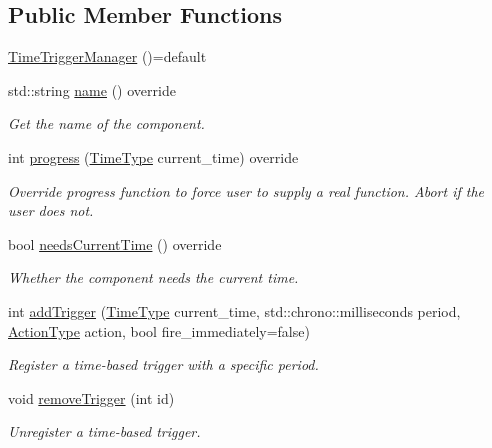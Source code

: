 \subsection*{Public Member Functions}
\begin{DoxyCompactItemize}
\item 
\hyperlink{structvt_1_1timetrigger_1_1_time_trigger_manager_a5739a97e0a8c7a19943d030a04e63a35}{Time\+Trigger\+Manager} ()=default
\item 
std\+::string \hyperlink{structvt_1_1timetrigger_1_1_time_trigger_manager_a8eba6c4f2596f9f8a6ad374ac020c8f4}{name} () override
\begin{DoxyCompactList}\small\item\em Get the name of the component. \end{DoxyCompactList}\item 
int \hyperlink{structvt_1_1timetrigger_1_1_time_trigger_manager_a15cc796e1f07dbf32c04b3fb3f3ce06c}{progress} (\hyperlink{namespacevt_a876a9d0cd5a952859c72de8a46881442}{Time\+Type} current\+\_\+time) override
\begin{DoxyCompactList}\small\item\em Override progress function to force user to supply a real function. Abort if the user does not. \end{DoxyCompactList}\item 
bool \hyperlink{structvt_1_1timetrigger_1_1_time_trigger_manager_a2e65cfcbbbb1224b08263996b0fb1eff}{needs\+Current\+Time} () override
\begin{DoxyCompactList}\small\item\em Whether the component needs the current time. \end{DoxyCompactList}\item 
int \hyperlink{structvt_1_1timetrigger_1_1_time_trigger_manager_a42729a0a83f734dad3ef6d95b5afb3d9}{add\+Trigger} (\hyperlink{namespacevt_a876a9d0cd5a952859c72de8a46881442}{Time\+Type} current\+\_\+time, std\+::chrono\+::milliseconds period, \hyperlink{namespacevt_ae0a5a7b18cc99d7b732cb4d44f46b0f3}{Action\+Type} action, bool fire\+\_\+immediately=false)
\begin{DoxyCompactList}\small\item\em Register a time-\/based trigger with a specific period. \end{DoxyCompactList}\item 
void \hyperlink{structvt_1_1timetrigger_1_1_time_trigger_manager_ae6bdddd787aa88b714686270587e1ff5}{remove\+Trigger} (int id)
\begin{DoxyCompactList}\small\item\em Unregister a time-\/based trigger. \end{DoxyCompactList}\item 

\end{DoxyCompactItemize}
